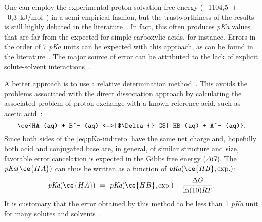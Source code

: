One can employ the experimental proton solvation free energy
($-$1104,5~$\pm$~0,3~kJ/mol~\cite{Tissandier_1998,Marenich_2009}) in a
semi-empirical fashion, but the trustworthiness of the results is still highly
debated in the literature~\cite{Yang_2013}.
In fact, this often produces \emph{pKa} values that are far from the expected
for simple carboxylic acids, for instance.
Errors in the order of 7 \emph{pKa} units can be expected with this approach,
as can be found in the literature~\cite{Pliego_2002,Ding_2009}.
The major source of error can be attributed to the lack of explicit
solute-solvent interactions~\cite{Pliego_2002}.

A better approach is to use a relative determination method~\cite{Ding_2009}.
This avoids the problems associated with the direct dissociation approach
by calculating the associated problem of proton exchange with a known reference
acid, such as acetic acid~\cite{Goldberg_2002}:
%
\begin{equation}
  \ce{HA (aq) + B^- (aq) <=>[$\Delta{} G$] HB (aq) + A^- (aq)}\text{.}
  \label{eq:pKa-indireto}
\end{equation}
%
Since both sides of the \cref{eq:pKa-indireto}
have the same net charge and, hopefully both acid and conjugated base are, in
general, of similar structure and size, favorable error cancelation is expected
in the Gibbs free energy ($\Delta G$).
The $\emph{pKa}(\ce{HA})$
can thus be written as a function of $\emph{pKa}(\ce{HB}, \text{exp.})$:
%
\begin{equation}
  \emph{pKa}(\ce{HA})~=~\emph{pKa}(\ce{HB}, \text{exp.}) + \frac{\Delta G}{\ln(10) R T}\text{.}
\end{equation}
%
It is customary that the error obtained by this method to be less than 1 \emph{pKa}
unit for many solutes and solvents~\cite{Ding_2009}.
